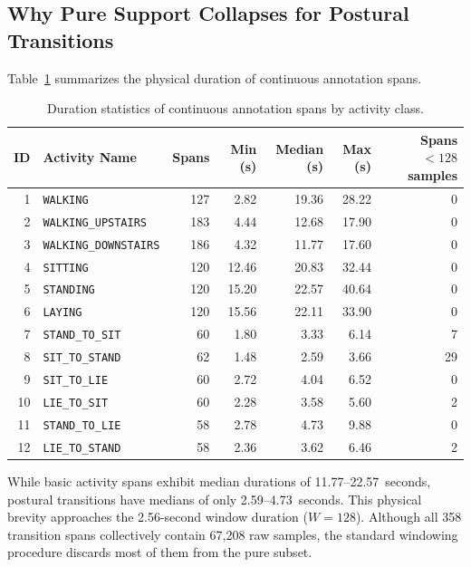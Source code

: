 \documentclass[11pt,a4paper]{article}
\newcommand{\code}[1]{{\small\ttfamily\nolinkurl{#1}}}
\theoremstyle{definition}
\begin{document}
\subsection{Why Pure Support Collapses for Postural Transitions}
Table~\ref{tab:span_durations} summarizes the physical duration of continuous annotation spans.

\begin{table}[htbp]\centering\small
\begin{tabular}{rlrrrrr}\toprule
ID & Activity Name & Spans & Min (s) & Median (s) & Max (s) & Spans $<128$ samples\\\midrule
1 & \code{WALKING} & 127 & 2.82 & 19.36 & 28.22 & 0\\
2 & \code{WALKING_UPSTAIRS} & 183 & 4.44 & 12.68 & 17.90 & 0\\
3 & \code{WALKING_DOWNSTAIRS} & 186 & 4.32 & 11.77 & 17.60 & 0\\
4 & \code{SITTING} & 120 & 12.46 & 20.83 & 32.44 & 0\\
5 & \code{STANDING} & 120 & 15.20 & 22.57 & 40.64 & 0\\
6 & \code{LAYING} & 120 & 15.56 & 22.11 & 33.90 & 0\\
7 & \code{STAND_TO_SIT} & 60 & 1.80 & 3.33 & 6.14 & 7\\
8 & \code{SIT_TO_STAND} & 62 & 1.48 & 2.59 & 3.66 & 29\\
9 & \code{SIT_TO_LIE} & 60 & 2.72 & 4.04 & 6.52 & 0\\
10 & \code{LIE_TO_SIT} & 60 & 2.28 & 3.58 & 5.60 & 2\\
11 & \code{STAND_TO_LIE} & 58 & 2.78 & 4.73 & 9.88 & 0\\
12 & \code{LIE_TO_STAND} & 58 & 2.36 & 3.62 & 6.46 & 2\\\bottomrule
\end{tabular}
\caption{Duration statistics of continuous annotation spans by activity class.}\label{tab:span_durations}
\end{table}

While basic activity spans exhibit median durations of 11.77--22.57~seconds, postural transitions have medians of only 2.59--4.73~seconds. This physical brevity approaches the 2.56-second window duration ($W=128$). Although all 358 transition spans collectively contain 67,208 raw samples, the standard windowing procedure discards most of them from the pure subset.
\end{document}
